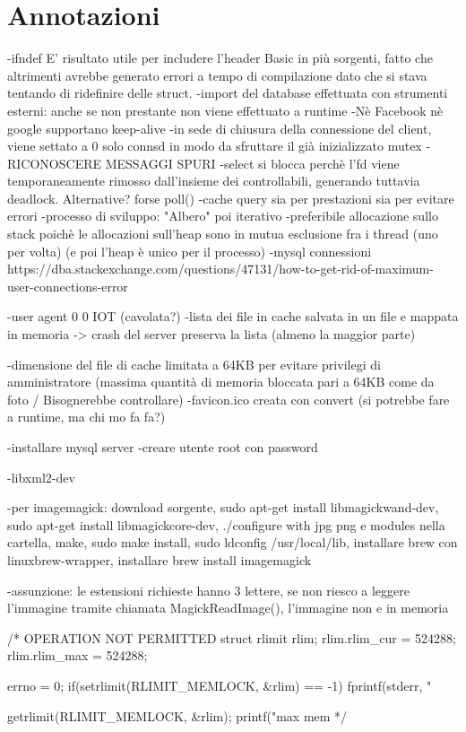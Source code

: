 \documentclass[paper=a4, oneside, fontsize=14pt, titlepage]{article}
\begin{document}
	\section{Annotazioni}
	\begin{flushleft}
		-ifndef E' risultato utile per includere l'header Basic in più sorgenti, fatto che altrimenti avrebbe generato errori a tempo di compilazione dato che si stava tentando di ridefinire delle struct.\newline
		-import del database effettuata con strumenti esterni: anche se non prestante non viene effettuato a runtime
		-Nè Facebook nè google supportano keep-alive
		-in sede di chiusura della connessione del client, viene settato a 0 solo connsd in modo da sfruttare il già inizializzato mutex
		-RICONOSCERE MESSAGGI SPURI
		-select si blocca perchè l'fd viene temporaneamente rimosso dall'insieme dei controllabili, generando tuttavia deadlock. Alternative? forse poll()
		-cache query sia per prestazioni sia per evitare errori
		-processo di sviluppo: "Albero" poi iterativo
		-preferibile allocazione sullo stack poichè le allocazioni sull'heap sono in mutua esclusione fra i thread (uno per volta) (e poi l'heap è unico per il processo)
		-mysql connessioni https://dba.stackexchange.com/questions/47131/how-to-get-rid-of-maximum-user-connections-error
		
		-user agent 0 0 IOT (cavolata?)
		-lista dei file in cache salvata in un file e mappata in memoria -> crash del server preserva la lista (almeno la maggior parte)
		
		-dimensione del file di cache limitata a 64KB per evitare privilegi di amministratore (massima quantità di memoria bloccata pari a 64KB come da foto / Bisognerebbe controllare)
		-favicon.ico creata con convert (si potrebbe fare a runtime, ma chi mo fa fa?)
		
		-installare mysql server
		-creare utente root con password
		
		-libxml2-dev
		
		-per imagemagick: download sorgente, sudo apt-get install libmagickwand-dev, sudo apt-get install libmagickcore-dev, ./configure with jpg png e modules nella cartella, make, sudo make install, sudo ldconfig /usr/local/lib, installare brew con linuxbrew-wrapper, installare brew install imagemagick


		-assunzione: le estensioni richieste hanno 3 lettere, se non riesco a leggere l'immagine tramite chiamata MagickReadImage(), l'immagine non e in memoria

		/* OPERATION NOT PERMITTED
		struct rlimit rlim;
		rlim.rlim\_cur = 524288;
		rlim.rlim\_max = 524288;

		errno = 0;
		if(setrlimit(RLIMIT\_MEMLOCK, \&rlim) == -1)
		fprintf(stderr, "%

		getrlimit(RLIMIT\_MEMLOCK, \&rlim);
		printf("max mem %
		*/
	\end{flushleft}

	
\end{document}
